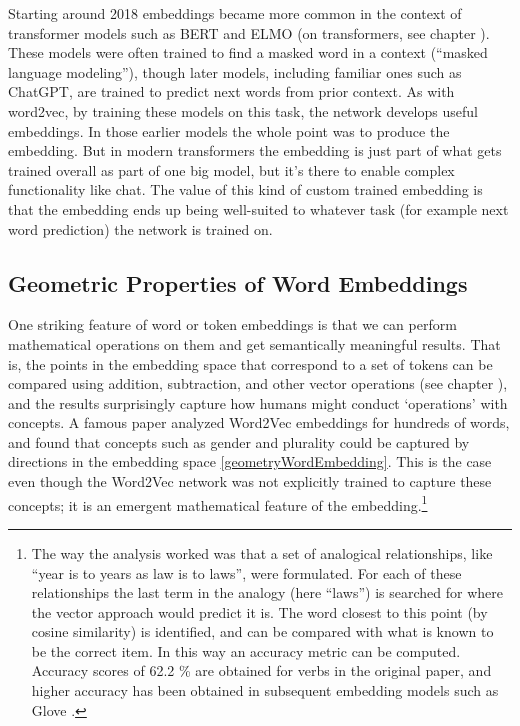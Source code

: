 Starting around 2018 embeddings became more common in the context of transformer models such as BERT and ELMO  (on transformers, see chapter ). These models were often trained to find a masked word in a context (``masked language modeling''), though later models, including familiar ones such as ChatGPT, are trained to predict next words from prior context. As with word2vec, by training these models on this task, the network develops useful embeddings.  In those earlier models the whole point was to produce the embedding. But in modern transformers the embedding is just part of what gets trained overall as part of one big model, but it's there to enable complex functionality like chat. The value of this kind of custom trained embedding is that the embedding ends up being well-suited to whatever task (for example next word prediction) the network is trained on.

\subsection{Geometric Properties of Word Embeddings}\label{geometryWordEmbeddings}

One striking feature of word or token embeddings is that we can perform mathematical operations on them and get semantically meaningful results. That is, the points in the embedding space that correspond to a set of tokens can be compared using addition, subtraction, and other vector operations (see chapter ), and the results surprisingly capture how humans might conduct `operations' with concepts.  A famous paper \cite{mikolov2013linguistic} analyzed Word2Vec embeddings for hundreds of words, and found that concepts such as gender and plurality could be captured by directions in the embedding space \ref{geometryWordEmbedding}. This is the case even though the Word2Vec network was not explicitly trained to capture these concepts; it is an emergent mathematical feature of the embedding.\footnote{The way the analysis worked was that a set of analogical relationships, like ``year is to years as law is to laws'', were formulated.  For each of these relationships the last term in the analogy (here ``laws'') is searched for where the vector approach would predict it is. The word closest to this point (by cosine similarity) is identified, and can be compared with what is known to be the correct item. In this way an accuracy metric can be computed.  Accuracy scores of 62.2 \% are obtained for verbs in the original paper, and higher accuracy has been obtained in subsequent embedding models such as Glove \cite{pennington2014glove}.}

